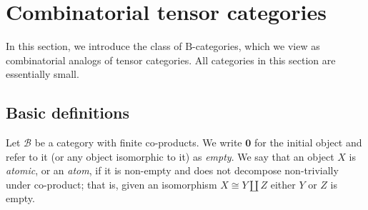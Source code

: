 \documentclass[12pt]{amsart}
\numberwithin{equation}{section}
\newtheorem{proposition}[equation]{Proposition}
\theoremstyle{definition}
\newcommand{\cB}{\mathcal{B}}
\newcommand{\rB}{\mathrm{B}}
\newcommand{\sE}{\mathscr{E}}
\newcommand{\bS}{\mathbf{S}}
\newcommand{\defn}[1]{\emph{#1}}
\newcommand{\bzero}{\mathbf{0}}
\begin{document}
%
%
%
%
%

\section{Combinatorial tensor categories} \label{s:Bcat}

In this section, we introduce the class of $\rB$-categories, which we view as combinatorial analogs of tensor categories. All categories in this section are essentially small.

\subsection{Basic definitions}

Let $\cB$ be a category with finite co-products. We write $\bzero$ for the initial object and refer to it (or any object isomorphic to it) as \defn{empty}. We say that an object $X$ is \defn{atomic}, or an \defn{atom}, if it is non-empty and does not decompose non-trivially under co-product; that is, given an isomorphism $X \cong Y \amalg Z$ either $Y$ or $Z$ is empty.
\end{document}
